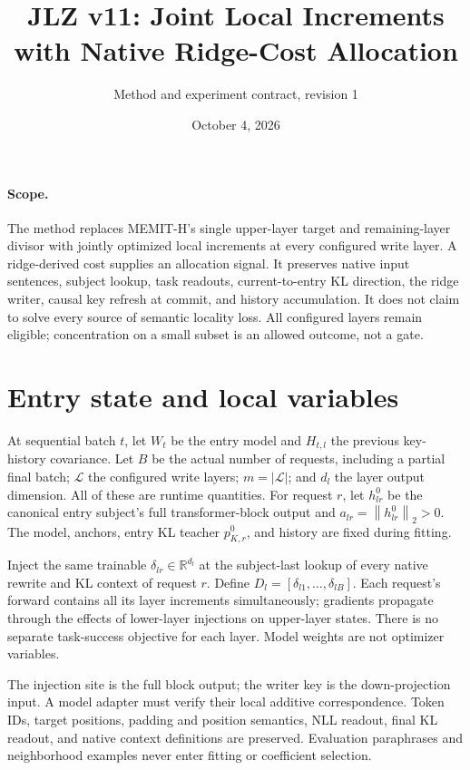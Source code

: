 \documentclass[11pt]{article}
\title{JLZ v11: Joint Local Increments with Native Ridge-Cost Allocation}
\author{Method and experiment contract, revision 1}
\date{October 4, 2026}
\newcommand{\norm}[1]{\left\lVert #1\right\rVert}
\begin{document}
\maketitle

\paragraph{Scope.}
The method replaces MEMIT-H's single upper-layer target and remaining-layer
divisor with jointly optimized local increments at every configured write layer.
A ridge-derived cost supplies an allocation signal. It preserves native input
sentences, subject lookup, task readouts, current-to-entry KL direction, the ridge
writer, causal key refresh at commit, and history accumulation. It does not claim
to solve every source of semantic locality loss. All configured layers remain
eligible; concentration on a small subset is an allowed outcome, not a gate.

\section{Entry state and local variables}
At sequential batch $t$, let $W_t$ be the entry model and $H_{t,l}$ the previous
key-history covariance. Let $B$ be the actual number of requests, including a
partial final batch; $\mathcal L$ the configured write layers; $m=|\mathcal L|$;
and $d_l$ the layer output dimension. All of these are runtime quantities.
For request $r$, let $h^0_{lr}$ be the canonical entry subject's full
transformer-block output and $a_{lr}=\norm{h^0_{lr}}_2>0$. The model, anchors,
entry KL teacher $p^0_{K,r}$, and history are fixed during fitting.

Inject the same trainable $\delta_{lr}\in\mathbb R^{d_l}$ at the subject-last
lookup of every native rewrite and KL context of request $r$. Define
$D_l=[\delta_{l1},\ldots,\delta_{lB}]$. Each request's forward contains all its
layer increments simultaneously; gradients propagate through the effects of
lower-layer injections on upper-layer states. There is no separate task-success
objective for each layer. Model weights are not optimizer variables.

The injection site is the full block output; the writer key is the down-projection
input. A model adapter must verify their local additive correspondence.
Token IDs, target positions, padding and position semantics, NLL readout, final
KL readout, and native context definitions are preserved. Evaluation paraphrases
and neighborhood examples never enter fitting or coefficient selection.
\end{document}
